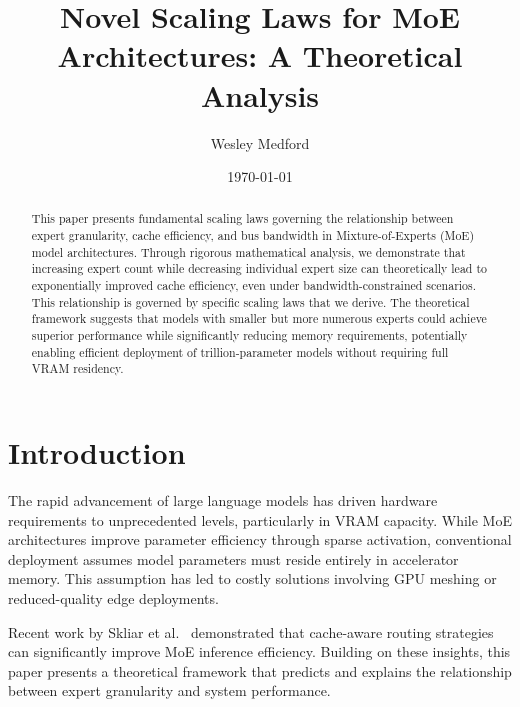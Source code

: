 \documentclass[11pt]{article}
\begin{document}
\title{\textbf{Novel Scaling Laws for MoE Architectures: A Theoretical Analysis}}
\author{Wesley Medford}
\date{\today}
\maketitle

\begin{abstract}
This paper presents fundamental scaling laws governing the relationship between expert granularity, cache efficiency, and bus bandwidth in Mixture-of-Experts (MoE) model architectures. Through rigorous mathematical analysis, we demonstrate that increasing expert count while decreasing individual expert size can theoretically lead to exponentially improved cache efficiency, even under bandwidth-constrained scenarios. This relationship is governed by specific scaling laws that we derive. The theoretical framework suggests that models with smaller but more numerous experts could achieve superior performance while significantly reducing memory requirements, potentially enabling efficient deployment of trillion-parameter models without requiring full VRAM residency.
\end{abstract}

\section{Introduction}

The rapid advancement of large language models has driven hardware requirements to unprecedented levels, particularly in VRAM capacity. While MoE architectures improve parameter efficiency through sparse activation, conventional deployment assumes model parameters must reside entirely in accelerator memory. This assumption has led to costly solutions involving GPU meshing or reduced-quality edge deployments.

Recent work by Skliar et al.~\cite{skliar2024} demonstrated that cache-aware routing strategies can significantly improve MoE inference efficiency. Building on these insights, this paper presents a theoretical framework that predicts and explains the relationship between expert granularity and system performance.
\end{document}
